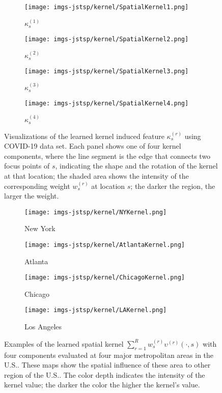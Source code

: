 \documentclass[journal]{IEEEtran}
\begin{document}
\begin{figure*}[!t]
\centering
\begin{subfigure}[h]{.49\linewidth}
\texttt{[image: imgs-jstsp/kernel/SpatialKernel1.png]}
\caption{$\kappa^{(1)}_s$}
\end{subfigure}
\begin{subfigure}[h]{.49\linewidth}
\texttt{[image: imgs-jstsp/kernel/SpatialKernel2.png]}
\caption{$\kappa^{(2)}_s$}
\end{subfigure}
\vfill
\begin{subfigure}[h]{.49\linewidth}
\texttt{[image: imgs-jstsp/kernel/SpatialKernel3.png]}
\caption{$\kappa^{(3)}_s$}
\end{subfigure}
\begin{subfigure}[h]{.49\linewidth}
\texttt{[image: imgs-jstsp/kernel/SpatialKernel4.png]}
\caption{$\kappa^{(4)}_s$}
\end{subfigure}
\caption{Visualizations of the learned kernel induced feature $\kappa^{(r)}_s$ using COVID-19 data set. Each panel shows one of four kernel components, where the line segment is the edge that connects two focus points of $s$, indicating the shape and the rotation of the kernel at that location; the shaded area shows the intensity of the corresponding weight $w_{s}^{(r)}$ at location $s$; the darker the region, the larger the weight.}
\label{fig:kernel-component}
\end{figure*}

\begin{figure*}[!t]
\centering
\begin{subfigure}[h]{0.245\linewidth}
\texttt{[image: imgs-jstsp/kernel/NYKernel.png]}
\caption{New York}
\end{subfigure}
\begin{subfigure}[h]{0.245\linewidth}
\texttt{[image: imgs-jstsp/kernel/AtlantaKernel.png]}
\caption{Atlanta}
\end{subfigure}
\begin{subfigure}[h]{0.245\linewidth}
\texttt{[image: imgs-jstsp/kernel/ChicagoKernel.png]}
\caption{Chicago}
\end{subfigure}
\begin{subfigure}[h]{0.245\linewidth}
\texttt{[image: imgs-jstsp/kernel/LAKernel.png]}
\caption{Los Angeles}
\end{subfigure}
\caption{Examples of the learned spatial kernel $\sum_{r=1}^R w_{s}^{(r)} \upsilon^{(r)}(\cdot, s)$ with four components evaluated at four major metropolitan areas in the U.S.. These maps show the spatial influence of these area to other region of the U.S.. The color depth indicates the intensity of the kernel value; the darker the color the higher the kernel's value.}
\label{fig:kernel}
\end{figure*}
\end{document}
